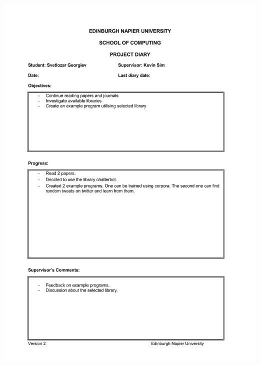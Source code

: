\documentclass[12pt,a4paper]{article}
\begin{document}
\begin{appendices}
\includegraphics[width=\textwidth,height=\textheight,keepaspectratio]{week4.jpg}
\newpage

\end{appendices}
\end{document}
